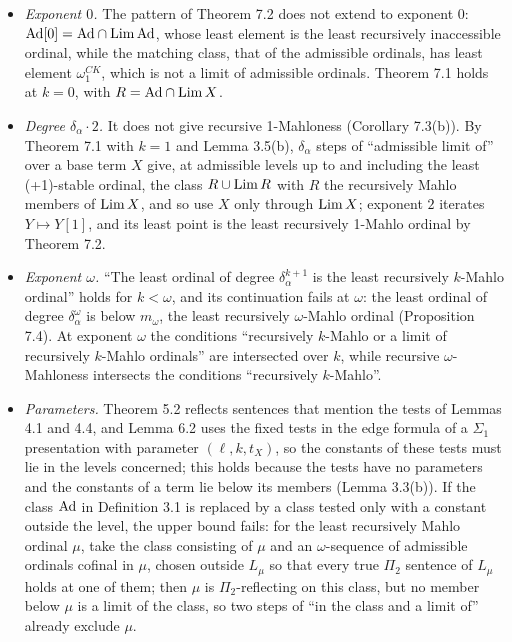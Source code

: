 \documentclass[11pt]{article}
\begin{document}
\begin{itemize}
\item \emph{Exponent $0$.} The pattern of Theorem 7.2 does not extend to exponent $0$: $\mathrm{Ad}[0] = \mathrm{Ad} \cap \mathrm{Lim}\, \mathrm{Ad}$,
  whose least element is the least recursively inaccessible ordinal, while the matching class, that of the admissible ordinals, has least
  element $\omega_1^{CK}$, which is not a limit of admissible ordinals. Theorem 7.1 holds at $k = 0$, with $R = \mathrm{Ad} \cap
  \mathrm{Lim}\, X$.
\item \emph{Degree $\delta_\alpha \cdot 2$.} It does not give recursive 1-Mahloness (Corollary 7.3(b)). By Theorem 7.1
  with $k = 1$ and Lemma 3.5(b), $\delta_\alpha$ steps of ``admissible limit of'' over a base term $X$ give,
  at admissible levels up to and including the least (+1)-stable ordinal, the class $R \cup \mathrm{Lim}\, R$ with $R$ the recursively Mahlo members of $\mathrm{Lim}\, X$, and so use $X$ only through $\mathrm{Lim}\, X$; exponent $2$ iterates $Y \mapsto Y[1]$, and its least point is
  the least recursively 1-Mahlo ordinal by Theorem 7.2.
\item \emph{Exponent $\omega$.} ``The least ordinal of degree $\delta_\alpha^{k+1}$ is the least recursively
  $k$-Mahlo ordinal'' holds for $k < \omega$, and its continuation fails at $\omega$: the least ordinal of degree
  $\delta_\alpha^\omega$ is below $m_\omega$, the least recursively $\omega$-Mahlo ordinal (Proposition 7.4). At
  exponent $\omega$ the conditions ``recursively $k$-Mahlo or a limit of recursively $k$-Mahlo ordinals'' are
  intersected over $k$, while recursive $\omega$-Mahloness intersects the conditions ``recursively $k$-Mahlo''.
\item \emph{Parameters.} Theorem 5.2 reflects sentences that mention the tests of Lemmas 4.1 and 4.4, and Lemma 6.2
  uses the fixed tests in the edge formula of a $\Sigma_1$ presentation with parameter $(\ell, k, t_X)$, so the constants of these tests must lie in the levels
  concerned; this holds because the tests have no parameters and the constants of a term lie below its members (Lemma
  3.3(b)). If the class $\mathrm{Ad}$ in Definition 3.1 is replaced by a class tested only with a constant outside the level,
  the upper bound fails: for the least recursively Mahlo ordinal $\mu$, take the class consisting of $\mu$ and an
  $\omega$-sequence of admissible ordinals cofinal in $\mu$, chosen outside $L_\mu$ so that every true $\Pi_2$ sentence
  of $L_\mu$ holds at one of them; then $\mu$ is $\Pi_2$-reflecting on this class, but no member below $\mu$ is a limit
  of the class, so two steps of ``in the class and a limit of'' already exclude $\mu$.
\end{itemize}
\end{document}
